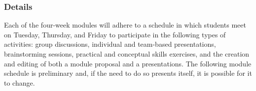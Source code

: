 \subsubsection*{Details}

Each of the four-week modules will adhere to a schedule in which students meet on Tuesday, Thursday, and Friday to
participate in the following types of activities: group discussions, individual and team-based presentations,
brainstorming sessions, practical and conceptual skills exercises, and the creation and editing of both a module
proposal and a presentations.  The following module schedule is preliminary and, if the need to do so presents itself, it
is possible for it to change.


\vspace*{.2in}
\hspace*{-.75in}
